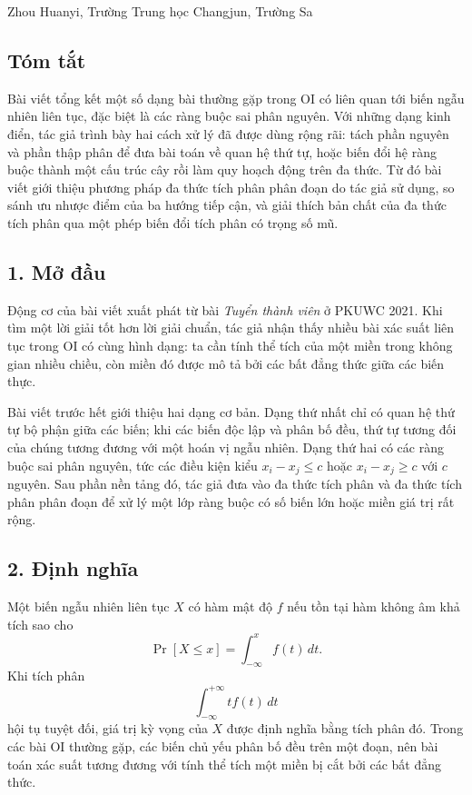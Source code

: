 \documentclass[11pt]{article}
\begin{document}
\begin{center}
Zhou Huanyi, Trường Trung học Changjun, Trường Sa
\end{center}

\subsection*{Tóm tắt}

Bài viết tổng kết một số dạng bài thường gặp trong OI có liên quan tới biến
ngẫu nhiên liên tục, đặc biệt là các ràng buộc sai phân nguyên. Với những dạng
kinh điển, tác giả trình bày hai cách xử lý đã được dùng rộng rãi: tách phần
nguyên và phần thập phân để đưa bài toán về quan hệ thứ tự, hoặc biến đổi hệ
ràng buộc thành một cấu trúc cây rồi làm quy hoạch động trên đa thức. Từ đó bài
viết giới thiệu phương pháp đa thức tích phân phân đoạn do tác giả sử dụng, so
sánh ưu nhược điểm của ba hướng tiếp cận, và giải thích bản chất của đa thức
tích phân qua một phép biến đổi tích phân có trọng số mũ.

\subsection*{1. Mở đầu}

Động cơ của bài viết xuất phát từ bài \emph{Tuyển thành viên} ở PKUWC 2021. Khi
tìm một lời giải tốt hơn lời giải chuẩn, tác giả nhận thấy nhiều bài xác suất
liên tục trong OI có cùng hình dạng: ta cần tính thể tích của một miền trong
không gian nhiều chiều, còn miền đó được mô tả bởi các bất đẳng thức giữa các
biến thực.

Bài viết trước hết giới thiệu hai dạng cơ bản. Dạng thứ nhất chỉ có quan hệ
thứ tự bộ phận giữa các biến; khi các biến độc lập và phân bố đều, thứ tự tương
đối của chúng tương đương với một hoán vị ngẫu nhiên. Dạng thứ hai có các ràng
buộc sai phân nguyên, tức các điều kiện kiểu \(x_i-x_j\le c\) hoặc
\(x_i-x_j\ge c\) với \(c\) nguyên. Sau phần nền tảng đó, tác giả đưa vào đa
thức tích phân và đa thức tích phân phân đoạn để xử lý một lớp ràng buộc có số
biến lớn hoặc miền giá trị rất rộng.

\subsection*{2. Định nghĩa}

Một biến ngẫu nhiên liên tục \(X\) có hàm mật độ \(f\) nếu tồn tại hàm không âm
khả tích sao cho
\[
  \Pr[X\le x]=\int_{-\infty}^{x} f(t)\,dt.
\]
Khi tích phân
\[
  \int_{-\infty}^{+\infty} t f(t)\,dt
\]
hội tụ tuyệt đối, giá trị kỳ vọng của \(X\) được định nghĩa bằng tích phân đó.
Trong các bài OI thường gặp, các biến chủ yếu phân bố đều trên một đoạn, nên
bài toán xác suất tương đương với tính thể tích một miền bị cắt bởi các bất
đẳng thức.
\end{document}
